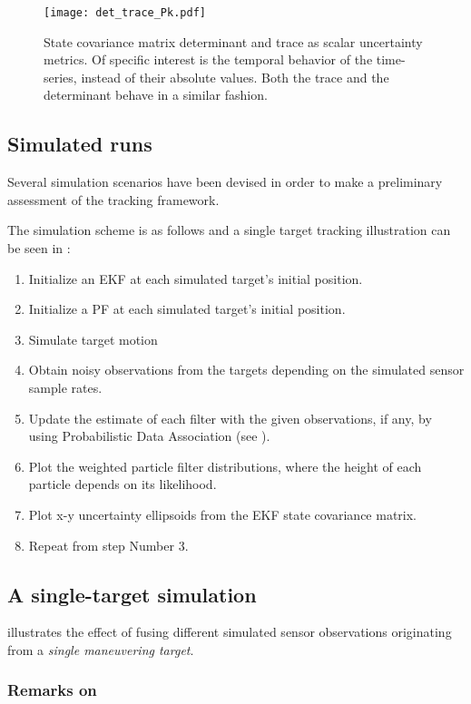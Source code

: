 \begin{figure}[H]
	\centering
	\texttt{[image: det\_trace\_Pk.pdf]}
	\caption{State covariance matrix determinant and trace as scalar uncertainty metrics. Of specific interest is the temporal behavior of the time-series, instead of their absolute values. Both the trace and the determinant behave in a similar fashion.}
	\label{fig:dettracepk}
\end{figure}


\subsection{Simulated runs}
Several simulation scenarios have been devised in order to make a preliminary assessment of the tracking framework. 

The simulation scheme is as follows and a single target tracking illustration can be seen in :

\begin{enumerate}
	\item Initialize an EKF at each simulated target's initial position.
	\item Initialize a PF at each simulated target's initial position.
	\item Simulate target motion
	\item Obtain noisy observations from the targets depending on the simulated sensor sample rates.
	\item Update the estimate of each filter with the given observations, if any, by using Probabilistic Data Association (see ).
	\item Plot the weighted particle filter distributions, where the height of each particle depends on its likelihood.
	\item Plot x-y uncertainty ellipsoids from the EKF state covariance matrix.
	\item Repeat from step Number 3.
\end{enumerate}
\subsection{A single-target simulation}
 illustrates the effect of fusing different simulated sensor observations originating from a \emph{single maneuvering target}.
%
\subsubsection{Remarks on }

